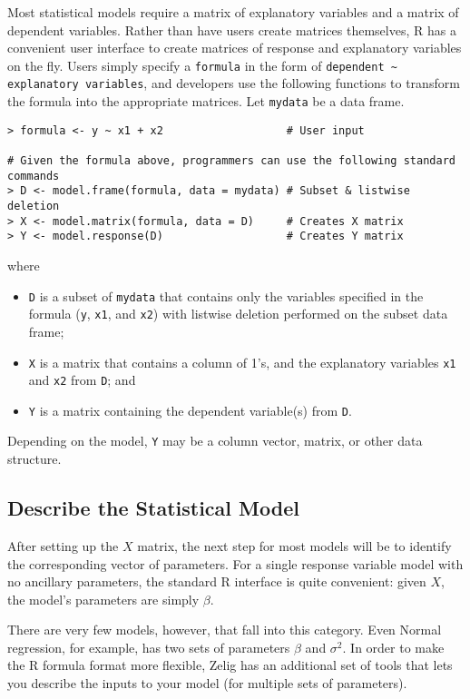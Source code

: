 Most statistical models require a matrix of explanatory variables and
a matrix of dependent variables.  Rather than have users create
matrices themselves, R has a convenient user interface to create
matrices of response and explanatory variables on the fly.  Users
simply specify a {\tt formula} in the form of 
\verb|dependent ~ explanatory variables|, and developers use the
following functions to transform the formula into the appropriate
matrices.  Let {\tt mydata} be a data frame.  
\begin{verbatim}
> formula <- y ~ x1 + x2                   # User input

# Given the formula above, programmers can use the following standard commands
> D <- model.frame(formula, data = mydata) # Subset & listwise deletion
> X <- model.matrix(formula, data = D)     # Creates X matrix
> Y <- model.response(D)                   # Creates Y matrix
\end{verbatim}
where 
\begin{itemize}
\item {\tt D} is a subset of {\tt mydata} that contains only the
variables specified in the formula ({\tt y}, {\tt x1}, and {\tt x2})
with listwise deletion performed on the subset data frame; 
\item {\tt X} is a matrix that contains a column of 1's, and the
explanatory variables {\tt x1} and {\tt x2} from {\tt D}; and
\item {\tt Y} is a matrix containing the dependent variable(s) from
{\tt D}.  
\end{itemize}  
Depending on the model, {\tt Y} may be a column vector, matrix, or
other data structure.  

\subsection{Describe the Statistical Model}  

After setting up the $X$ matrix, the next step for most models will be
to identify the corresponding vector of parameters.  For a single
response variable model with no ancillary parameters, the standard R
interface is quite convenient: given $X$, the model's parameters are
simply $\beta$.

There are very few models, however, that fall into this category.
Even Normal regression, for example, has two sets of parameters
$\beta$ and $\sigma^2$.  In order to make the R formula format more
flexible, Zelig has an additional set of tools that lets you describe
the inputs to your model (for multiple sets of parameters).

